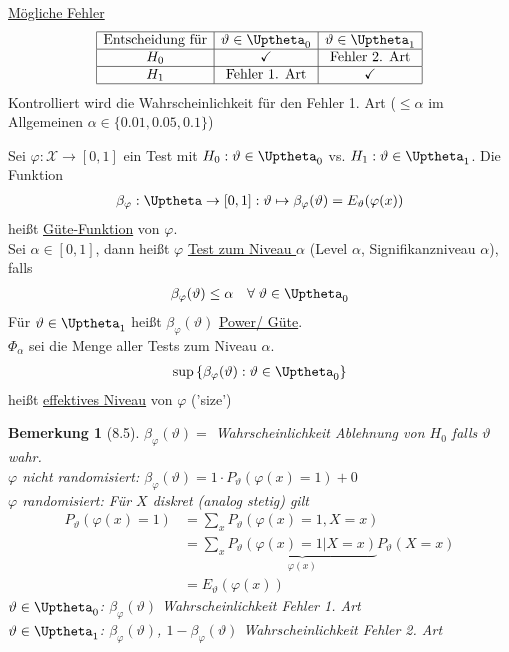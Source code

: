 \documentclass[a4paper,openany]{book}
\theoremstyle{mytheoremstyle}
\newtheorem*{bem}{Bemerkung}
\theoremstyle{mytheoremstyle2}
\begin{document}
\underline{Mögliche Fehler}
\begin{align*}
  \begin{array}{|c|c|c|}\hline
    \text{Entscheidung für}&\vartheta \in \Uptheta_0&\vartheta \in \Uptheta_1\\\hline
    H_0&\checkmark&\text{Fehler 2. Art}\\\hline
    H_1&\text{Fehler 1. Art}&\checkmark
  \\\hline\end{array}
\end{align*}
Kontrolliert wird die Wahrscheinlichkeit für den Fehler 1. Art ($\leq \alpha $ im Allgemeinen $\alpha \in \{0.01,0.05,0.1\}$)
\begin{defi}{8.4}{}
  Sei $\varphi :\mathcal{X}\to[0,1]$ ein Test mit $H_0:\vartheta \in \Uptheta_0$ vs. $H_1:\vartheta \in \Uptheta_1$. Die Funktion 
  \begin{align*}
    \beta _{\varphi }:\Uptheta\to [0,1]:\vartheta \mapsto \beta _{\varphi }(\vartheta )=E _{\vartheta }(\varphi (x))
  \end{align*}
  heißt \underline{Güte-Funktion} von $\varphi $.\\
  Sei $\alpha \in [0,1]$, dann heißt $\varphi $ \underline{Test zum Niveau $\alpha $} (Level $\alpha $, Signifikanzniveau $\alpha $), falls
  \begin{align*}
    \beta _{\varphi }(\vartheta )\leq \alpha \quad\forall\;\vartheta \in \Uptheta_0
  \end{align*}
  Für $\vartheta \in \Uptheta_1$ heißt $\beta _{\varphi }(\vartheta )$ \underline{Power/ Güte}. \\
  $\Phi _{\alpha }$ sei die Menge aller Tests zum Niveau $\alpha $.  
  \begin{align*}
    \sup \left\{\beta _{\varphi }(\vartheta ):\vartheta \in \Uptheta_0\right\}
  \end{align*}
  heißt \underline{effektives Niveau} von $\varphi $ ('size') 
\end{defi}
\begin{bem}[8.5]
  $\beta _{\varphi }(\vartheta )=$ Wahrscheinlichkeit Ablehnung von $H_0$ falls $\vartheta $ wahr. \\
  $\varphi $ nicht randomisiert: $\beta _{\varphi }(\vartheta )=1 \cdot P _{\vartheta }(\varphi (x)=1)+0$  \\
  $\varphi $ randomisiert: Für $X$ diskret (analog stetig) gilt 
  \begin{align*}
    P _{\vartheta }(\varphi (x)=1)
    &=\sum_{x}^{}{P _{\vartheta }(\varphi (x)=1,X=x)}\\
    &=\sum_{x}^{}{\underbrace{P _{\vartheta }(\varphi (x)=1|X=x)}_{\varphi (x)}P _{\vartheta }(X=x)}\\
    &=E _{\vartheta }(\varphi (x))
  \end{align*}
  $\vartheta \in \Uptheta_0$: $\beta _{\varphi }(\vartheta )$ Wahrscheinlichkeit Fehler 1. Art\\
  $\vartheta \in \Uptheta_1$: $\beta _{\varphi }(\vartheta )$, $1-\beta _{\varphi }(\vartheta )$  Wahrscheinlichkeit Fehler 2. Art
\end{bem}
\end{document}

